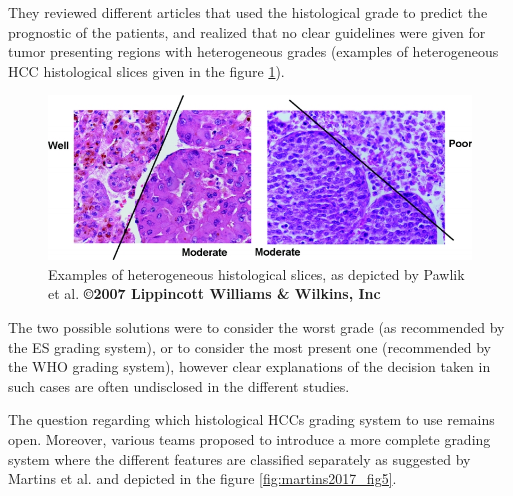 \documentclass[]{article}
\begin{document}
They reviewed different articles that used the histological grade to
predict the prognostic of the patients, and realized that no clear
guidelines were given for tumor presenting regions with heterogeneous
grades (examples of heterogeneous HCC histological slices given in the figure \ref{fig:pawlik_fig4}).

\begin{figure}[th!]
\centering
\includegraphics[width=0.7\linewidth]{images/pawlik_fig4}
\caption{Examples of heterogeneous histological slices, as depicted by Pawlik et al. \cite{Pawlik2007} \textbf{©2007 Lippincott Williams \& Wilkins, Inc}}
\label{fig:pawlik_fig4}
\end{figure}


The two possible solutions were to consider the worst grade (as
recommended by the ES grading system), or to consider the most present
one (recommended by the WHO grading system), however clear explanations
of the decision taken in such cases are often undisclosed in the
different studies.

The question regarding which histological HCCs grading system to use
remains open. Moreover, various teams proposed to introduce a more
complete grading system where the different features are classified
separately as suggested by Martins et al. and depicted in the
figure \ref{fig:martins2017_fig5}.
\end{document}
